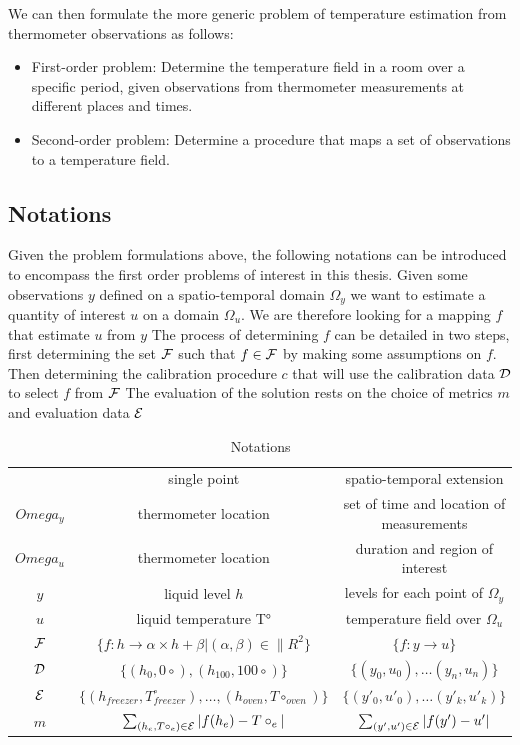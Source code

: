 \begin{bibunit}
We can then formulate the more generic problem of temperature estimation from thermometer observations as follows:

\begin{itemize}
    \item First-order problem: Determine the temperature field in a room over a specific period, given observations from thermometer measurements at different places and times.
    \item Second-order problem: Determine a procedure that maps a set of observations to a temperature field.
\end{itemize}

\subsection{Notations}
Given the problem formulations above, the following notations can be introduced to encompass the first order problems of interest in this thesis.
Given some observations $y$ defined on a spatio-temporal domain $\Omega_y$ we want to estimate a quantity of interest $u$ on a domain $\Omega_u$. We are therefore looking for a mapping $f$ that estimate $u$ from $y$
The process of determining $f$ can be detailed in two steps, first determining the set $\cal{F}$ such that $f \in \cal{F}$ by making some assumptions on $f$. Then determining the calibration procedure $c$ that will use the calibration data $\cal{D}$ to select $f$ from $\cal{F}$
The evaluation of the solution rests on the choice of metrics $m$ and evaluation data $\cal{E}$

\begin{table}
\begin{tabular}{c|c|c}
   & single point & spatio-temporal extension\\
  $Omega_y$ & thermometer location& set of time and location of measurements\\
  $Omega_u$ & thermometer location& duration and region of interest\\
  $y$ & liquid level $h$ & levels for each point of $\Omega_y$\\
  $u$ & liquid temperature T° &  temperature field over $\Omega_u$\\
  $\cal{F}$ & $\{ f: h \to \alpha \times h + \beta | (\alpha, \beta) \in \|R^2\}$ &  $\{f: y \to u\}$\\
  $\cal{D}$ & $\{(h_{0}, 0\circ), (h_{100}, 100\circ)\}$ & $\{(y_0, u_0), \dots (y_n, u_n)\}$\\
  $\cal{E}$ & $\{(h_{freezer}, T^{\circ}_{freezer}), \dots, (h_{oven}, T\circ_{oven})\}$ & $\{(y'_0, u'_0), \dots (y'_k, u'_k)\}$\\
  $m$ & $\sum_{(h_e, T\circ_e)\in\cal{E}} |f(h_e) - T\circ_e|$ & $\sum_{(y', u')\in\cal{E}} |f(y') - u'|$ \\
\end{tabular}
    \centering
    \caption{Notations }
    \label{table:notations}
\end{table}


\end{bibunit}
